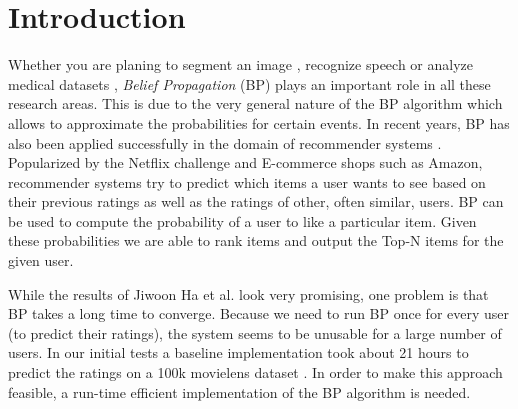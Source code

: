 
\section{Introduction}\label{sec:intro}

Whether you are planing to segment an image \cite{1544822}, recognize speech \cite{5373446} or analyze medical datasets \cite{bailly2011finding}, \textit{Belief Propagation} (BP) plays an important role in all these research areas. This is due to the very general nature of the BP algorithm which allows to approximate the probabilities for certain events. In recent years, BP has also been applied successfully in the domain of recommender systems \cite{Ha:2012:TRT:2396761.2398636}. Popularized by the Netflix challenge and E-commerce shops such as Amazon, recommender systems try to predict which items a user wants to see based on their previous ratings as well as the ratings of other, often similar, users. BP can be used to compute the probability of a user to like a particular item. Given these probabilities we are able to rank items and output the Top-N items for the given user.

 




While the results of Jiwoon Ha et al.\cite{Ha:2012:TRT:2396761.2398636} look very promising, one problem is that BP takes a long time to converge. Because we need to run BP once for every user (to predict their ratings), the system seems to be unusable for a large number of users. In our initial tests a baseline implementation took about 21 hours to predict the ratings on a 100k movielens dataset \cite{riedl1998movielens}. In order to make this approach feasible, a  run-time efficient implementation of the BP algorithm is needed.

